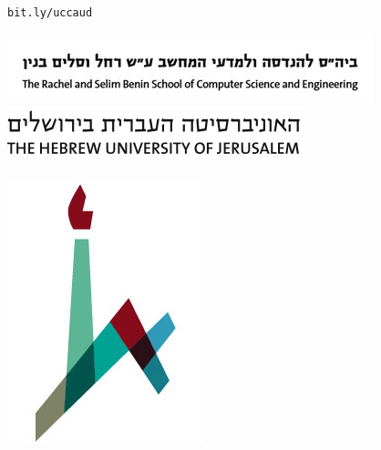 \documentclass[extrafontsizes,60pt,twocolumn]{memoir}
\begin{document}
\begin{strip}
\begin{center}
\begin{minipage}[b]{.6\linewidth}
    \vspace{1cm}
    \LARGE\texttt{bit.ly/{\color{blue}ucca}{\color{red}ud}}
  \end{minipage}
  \hspace{1in}
  \begin{minipage}[b]{.15\linewidth}
    \hspace{-1in} \includegraphics[width=1.12\linewidth]{cse_banner.jpg} \\
    \includegraphics[width=\linewidth]{huji_banner.png}
    \vspace{-1cm}
  \end{minipage}
  \begin{minipage}[b]{.05\linewidth}
    \includegraphics[width=\linewidth]{huji_logo.jpg}
    \vspace{-1cm}
  \end{minipage}
  \end{center}
\end{strip}
\end{document}
